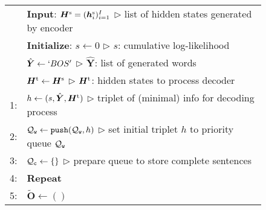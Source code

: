 \documentclass[11pt]{article}
\begin{document}
\begin{figure}[t]
 \centering
 \tabcolsep=1pt
 \small
 \begin{tabular}{rp{71mm}}
  \hline
  \ &\hspace{-1.2em}\textbf{Input}:
  $\bm{H}^{\rm s} = (\bm{h}^{\rm s}_i)^{I}_{i=1}$
  \hspace{\fill} {$\triangleright$ {\scriptsize list of hidden states generated by encoder}}
  \\
  \ &\hspace{-1.2em}\textbf{Initialize}:
      $s \leftarrow 0$
      \hspace{\fill}$\triangleright$ {\scriptsize $s$: cumulative log-likelihood}
      \\
  &\hspace{3.0em}
      $\hat{\bm{Y}} \leftarrow `BOS'$
      \hspace{\fill}$\triangleright$ {\scriptsize $\hat{\bm{Y}}$: list of generated words}
      \\
  &\hspace{3.0em}
      $\bm{H}^{\rm t} \leftarrow \bm{H}^{\rm s}$
      \hspace{\fill}$\triangleright$ {\scriptsize $\bm{H}^{\rm t}$: hidden states to process decoder}
      \\
  1:&\hspace{0.0em}
      $h \leftarrow (s, \hat{\bm{Y}}, \bm{H}^{\rm t})$
      \hspace{\fill}$\triangleright$ {\scriptsize triplet of (minimal) info for decoding process}
      \\
  2:&\hspace{0.0em}
      ${\cal Q}_{\tt w} \leftarrow {\tt push}({\cal Q}_{\tt w},h)$
      \hspace{\fill}$\triangleright$ {\scriptsize set initial triplet $h$ to priority queue ${\cal Q}_{\tt w}$}
      \\
  3:&\hspace{0.0em}
      ${\cal Q}_{\tt c} \leftarrow \{\}$
      \hspace{\fill}$\triangleright$ {\scriptsize prepare queue to store complete sentences}
      \\
  4:&\hspace{0.0em}
      \textbf{Repeat} \\
  5:&\hspace{3.0mm}
      $\tilde{\bm{O}} \leftarrow () $

\end{tabular}
\end{figure}
\end{document}

